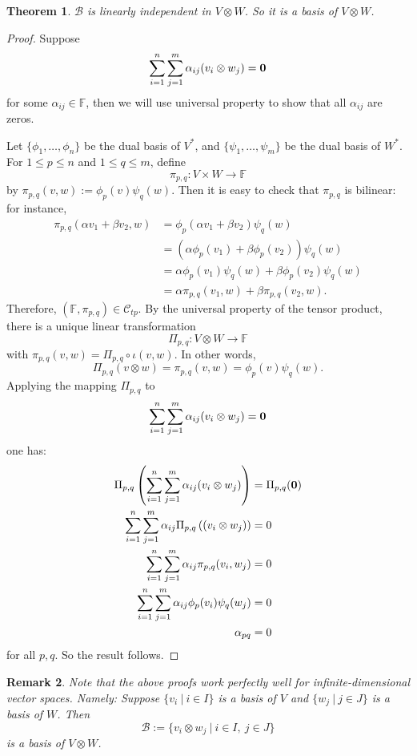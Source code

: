 \documentclass[12pt]{amsbook}
\newtheorem{theorem}{Theorem}[section]
\newtheorem{remark}[theorem]{Remark}
\begin{document}
\begin{theorem}
    $\mathcal{B}$ is linearly independent in $V \otimes W$. So it is a basis of $V \otimes W$.
\end{theorem}
\begin{proof}
Suppose
    \begin{align*}
\sum_{i=1}^n \sum^m_{j=1} \alpha_{ij} (v_i \otimes w_j) = {\bf 0}
\end{align*}
for some $\alpha_{ij} \in \mathbb{F}$, then we will use universal property to show that all $\alpha_{ij}$ are zeros.

Let $\{\phi_1, \dots ,\phi_n\}$ be the dual basis of $V^*$, and $\{\psi_1, \dots ,\psi_m\}$ be the dual basis of $W^*$. For $1 \leq p \leq n$ and $1 \leq q \leq m$, define
$$\pi_{p,q} : V \times W \to \mathbb{F}$$
by $\pi_{p,q}(v,w) := \phi_p(v) \psi_q(w)$. Then it is easy to check that $\pi_{p,q}$ is bilinear: for instance,
\begin{align*}
\pi_{p,q}(\alpha v_1 + \beta v_2,w) &= \phi_p( \alpha v_1 + \beta v_2) \psi_q(w) \\
&= (\alpha \phi_p(v_1) + \beta\phi_p(v_2)) \psi_q(w) \\
&= \alpha \phi_p(v_1) \psi_q(w) + \beta\phi_p(v_2) \psi_q(w) \\
&= \alpha \pi_{p,q}(v_1,w) + \beta\pi_{p,q}(v_2,w).
\end{align*}
Therefore, $(\mathbb{F}, \pi_{p,q}) \in \mathcal{C}_{tp}$. By the universal property of the tensor product, there is a unique linear transformation
$$\Pi_{p,q} : V \otimes W \to \mathbb{F}$$
with $\pi_{p,q}(v,w) = \Pi_{p,q} \circ \iota(v,w)$.
In other words,
$$\Pi_{p,q}(v \otimes w) = \pi_{p,q}(v,w) = \phi_p(v) \psi_q(w).$$
Applying the mapping $\Pi_{p,q}$ to
$$\sum_{i=1}^n \sum^m_{j=1} \alpha_{ij} (v_i \otimes w_j) = {\bf 0}$$
one has:
\begin{align*}
\Pi_{p,q}\left(\sum_{i=1}^n \sum^m_{j=1} \alpha_{ij} (v_i \otimes w_j)\right) &= \Pi_{p,q}({\bf 0}) \\
\sum_{i=1}^n \sum^m_{j=1} \alpha_{ij} \Pi_{p,q}\left((v_i \otimes w_j)\right) &= 0 \\
\sum_{i=1}^n \sum^m_{j=1} \alpha_{ij} \pi_{p,q}(v_i, w_j) &= 0 \\
\sum_{i=1}^n \sum^m_{j=1} \alpha_{ij} \phi_{p}(v_i)\psi_q(w_j) &= 0 \\
\alpha_{pq} &= 0
\end{align*}
for all $p, q$. So the result follows.
\end{proof}

\begin{remark} \label{rmk-inftensor}
    Note that the above proofs work perfectly well for infinite-dimensional vector spaces. Namely: 
    Suppose $\{v_i\ |\ i \in I\}$ is a basis of $V$ and $\{w_j\ |\ j \in J\}$ is a basis of $W$. Then
    $$\mathcal{B} := \{v_i \otimes w_j\ |\ i\in I,\ j \in J\}$$
    is a basis of $V \otimes W$.
\end{remark}
\end{document}
